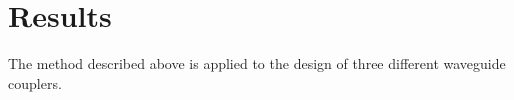 \documentclass[letterpaper,10pt]{article}
\begin{document}
\section{Results}
The method described above is applied to 
    the design of three different waveguide couplers.
% 
% 
% 
% 
% 
% 
% 
\end{document}
